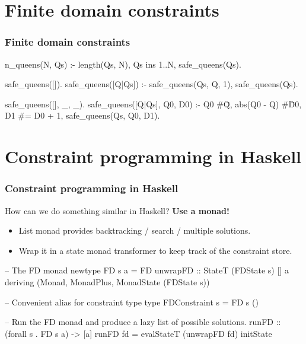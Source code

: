 \documentclass[aspectratio=169,hyphens]{beamer} %
\begin{document}
\section{Finite domain constraints}

\begin{frame}[fragile]
    \frametitle{Finite domain constraints}

\begin{prologcode}
n_queens(N, Qs) :-
        length(Qs, N),
        Qs ins 1..N,
        safe_queens(Qs).

safe_queens([]).
safe_queens([Q|Qs]) :- safe_queens(Qs, Q, 1), safe_queens(Qs).

safe_queens([], _, _).
safe_queens([Q|Qs], Q0, D0) :-
        Q0 #\= Q,
        abs(Q0 - Q) #\= D0,
        D1 #= D0 + 1,
        safe_queens(Qs, Q0, D1).
\end{prologcode}

\end{frame}

\section{Constraint programming in Haskell}

\begin{frame}[fragile]
    \frametitle{Constraint programming in Haskell}
How can we do something similar in Haskell?\pause{}
\textbf{Use a monad!}
\pause
\begin{itemize}
    \item List monad provides backtracking / search / multiple solutions.
        \pause
    \item Wrap it in a state monad transformer to keep track of the constraint store.
        \pause
\end{itemize}
\begin{code}
-- The FD monad
newtype FD s a = FD { unwrapFD :: StateT (FDState s) [] a }
    deriving (Monad, MonadPlus, MonadState (FDState s))
\end{code}
\pause
\begin{code}
-- Convenient alias for constraint type
type FDConstraint s = FD s ()
\end{code}
\pause
\begin{code}
-- Run the FD monad and produce a lazy list of possible solutions.
runFD :: (forall s . FD s a) -> [a]
runFD fd = evalStateT (unwrapFD fd) initState
\end{code}
\end{frame}
\end{document}
